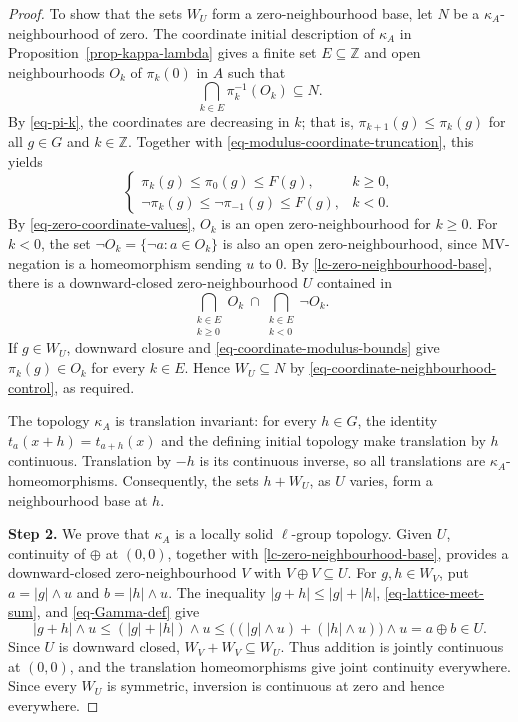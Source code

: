 \documentclass[preprint,3p]{elsarticle}
\theoremstyle{plain}
\theoremstyle{definition}
\numberwithin{equation}{section}
\begin{document}
\begin{proof}
To show that the sets $W_U$ form a zero-neighbourhood
base, let $N$ be a $\kappa_A$-neighbourhood of zero.
The coordinate initial description of $\kappa_A$ in
Proposition~\ref{prop-kappa-lambda} gives a finite set
$E\subseteq\mathbb Z$ and open neighbourhoods $O_k$ of $\pi_k(0)$
in $A$ such that
\begin{equation}
\label{eq-coordinate-neighbourhood-control}
 \bigcap_{k\in E}\pi_k^{-1}(O_k)\subseteq N.
\end{equation}
By \eqref{eq-pi-k}, the coordinates are decreasing in $k$;
that is, $\pi_{k+1}(g)\leq\pi_k(g)$ for all
$g\in G$ and $k\in\mathbb Z$.
Together with \eqref{eq-modulus-coordinate-truncation},
this yields
\begin{equation}
\label{eq-coordinate-modulus-bounds}
 \begin{cases}
  \pi_k(g)\leq\pi_0(g)\leq F(g),&k\geq0,\\
  \neg\pi_k(g)\leq\neg\pi_{-1}(g)\leq F(g),&k<0.
 \end{cases}
\end{equation}
By \eqref{eq-zero-coordinate-values}, $O_k$ is an
open zero-neighbourhood for $k\geq0$.
For $k<0$, the set
$\neg O_k=\{\neg a:a\in O_k\}$ is also an
open zero-neighbourhood, since MV-negation is a
homeomorphism sending $u$ to $0$.
By \ref{lc-zero-neighbourhood-base}, there is a downward-closed
zero-neighbourhood $U$ contained in
\[
 \bigcap_{\substack{k\in E\\k\geq0}}O_k
 \ \cap\!
 \bigcap_{\substack{k\in E\\k<0}}\neg O_k.
\]
If $g\in W_U$, downward closure and
\eqref{eq-coordinate-modulus-bounds} give
$\pi_k(g)\in O_k$ for every $k\in E$.
Hence $W_U\subseteq N$ by
\eqref{eq-coordinate-neighbourhood-control}, as required.

The topology $\kappa_A$ is translation invariant: for every
$h\in G$, the identity
$t_a(x+h)=t_{a+h}(x)$ and the defining initial topology
make translation by $h$ continuous.  Translation by $-h$
is its continuous inverse, so all translations are
$\kappa_A$-homeomorphisms.  Consequently, the sets
$h+W_U$, as $U$ varies, form a neighbourhood base at $h$.

\textbf{Step 2.} We prove that $\kappa_A$ is a locally solid
$\ell$-group topology.
Given $U$, continuity of $\oplus$ at $(0,0)$, 
together with \ref{lc-zero-neighbourhood-base}, provides a
downward-closed zero-neighbourhood $V$ with $V\oplus V\subseteq U$.  
For $g,h\in W_V$, put
$a=|g|\wedge u$ and $b=|h|\wedge u$.  The inequality
$|g+h|\leq|g|+|h|$, \eqref{eq-lattice-meet-sum}, and \eqref{eq-Gamma-def} give
\[
 |g+h|\wedge u
 \leq (|g|+|h|)\wedge u
 \leq \bigl((|g|\wedge u)+(|h|\wedge u)\bigr)\wedge u
 =a\oplus b\in U.
\]
Since $U$ is downward closed, $W_V+W_V\subseteq W_U$.
Thus addition is jointly continuous at $(0,0)$, and the translation
homeomorphisms give joint continuity everywhere.  
Since every $W_U$ is symmetric, inversion is continuous
at zero and hence everywhere.


\end{proof}
\end{document}
